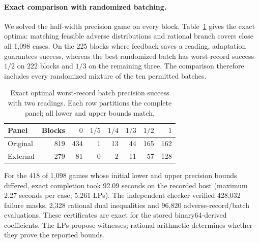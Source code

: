 \paragraph{Exact comparison with randomized batching.}
We solved the half-width precision game on every block.
Table~\ref{tab:joint_precision_status} gives the exact optima: matching
feasible adverse distributions and rational branch covers close all
1,098 cases. On the 225 blocks where feedback saves a reading, adaptation
guarantees success, whereas the best randomized batch has worst-record
success $1/2$ on 222 blocks and $1/3$ on the remaining three.
The comparison therefore includes every randomized mixture of the ten
permitted batches.

\begin{table}[htbp]\centering\small
\caption{Exact optimal worst-record batch precision success with two readings.
Each row partitions the complete panel; all lower and upper bounds match.}
\label{tab:joint_precision_status}
\begin{tabular}{lrrrrrrr}\toprule
Panel & Blocks & $0$ & $1/5$ & $1/4$ & $1/3$ & $1/2$ & $1$\\\midrule
Original & 819 & 434 & 1 & 13 & 44 & 165 & 162\\
External & 279 & 81 & 0 & 2 & 11 & 57 & 128\\\bottomrule
\end{tabular}\end{table}

For the 418 of 1,098 games whose initial lower and upper precision bounds
differed, exact completion took 92.09 seconds on the recorded host (maximum 2.27 seconds per case; 5,261 LPs). The independent
checker verified 428,032 failure masks, 2,328 rational dual inequalities
and 96,820 adverse-record/batch evaluations. These certificates are exact
for the stored binary64-derived coefficients. The LPs propose witnesses;
rational arithmetic determines whether they prove the reported bounds.
